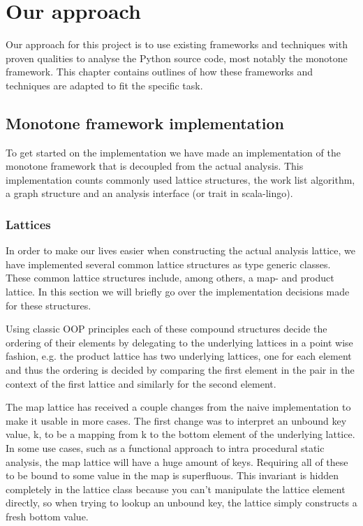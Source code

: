 \chapter{Our approach}

Our approach for this project is to use existing frameworks and techniques with proven qualities to analyse the Python source code, most notably the monotone framework. This chapter contains outlines of how these frameworks and techniques are adapted to fit the specific task.

\section{Monotone framework implementation}

To get started on the implementation we have made an implementation of the monotone framework that is decoupled from the actual analysis. This implementation counts commonly used lattice structures, the work list algorithm, a graph structure and an analysis interface (or trait in scala-lingo).

\subsection{Lattices}

In order to make our lives easier when constructing the actual analysis lattice, we have implemented several common lattice structures as type generic classes. These common lattice structures include, among others, a map- and product lattice. In this section we will briefly go over the implementation decisions made for these structures.

Using classic OOP principles each of these compound structures decide the ordering of their elements by delegating to the underlying lattices in a point wise fashion, e.g. the product lattice has two underlying lattices, one for each element and thus the ordering is decided by comparing the first element in the pair in the context of the first lattice and similarly for the second element.

The map lattice has received a couple changes from the naive implementation to make it usable in more cases. The first change was to interpret an unbound key value, k, to be a mapping from k to the bottom element of the underlying lattice. In some use cases, such as a functional approach to intra procedural static analysis, the map lattice will have a huge amount of keys. Requiring all of these to be bound to some value in the map is superfluous. This invariant is hidden completely in the lattice class because you can't manipulate the lattice element directly, so when trying to lookup an unbound key, the lattice simply constructs a fresh bottom value.

